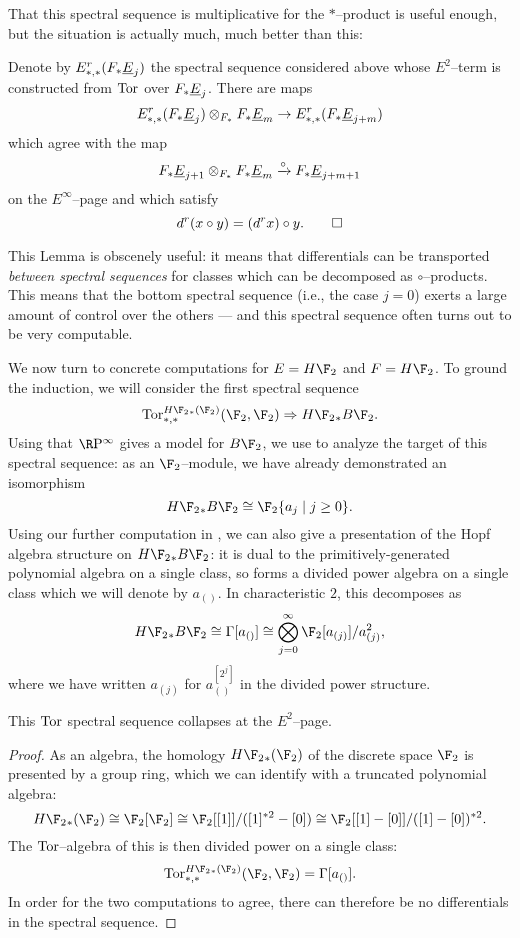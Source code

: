 That this spectral sequence is multiplicative for the $\ast$--product is useful enough, but the situation is actually much, much better than this:
\begin{lemma}\label{CircProductAndDifferentials}
Denote by $E^r_{*, *}(F_* \underline{\smash{E}}_{j})$ the spectral sequence considered above whose $E^2$--term is constructed from $\operatorname{Tor}$ over $F_* \underline{\smash{E}}_{j}$.  There are maps \[E^r_{*, *}(F_* \underline{\smash{E}}_{j}) \otimes_{F_*} F_* \underline{\smash{E}}_{m} \to E^r_{*, *}(F_* \underline{\smash{E}}_{j+m})\] which agree with the map \[F_* \underline{\smash{E}}_{j+1} \otimes_{F_*} F_* \underline{\smash{E}}_{m} \xrightarrow{\circ} F_* \underline{\smash{E}}_{j+m+1}\] on the $E^\infty$--page and which satisfy \[d^r(x \circ y) = (d^r x) \circ y. \qed\]
\end{lemma}
\noindent This Lemma is obscenely useful: it means that differentials can be transported \emph{between spectral sequences} for classes which can be decomposed as $\circ$--products.  This means that the bottom spectral sequence (i.e., the case $j = 0$) exerts a large amount of control over the others --- and this spectral sequence often turns out to be very computable.

We now turn to concrete computations for $E = H\F_2$ and $F = H\F_2$.  To ground the induction, we will consider the first spectral sequence \[\Tor^{H\F_2{}_*(\F_2)}_{*, *}(\F_2, \F_2) \Rightarrow H\F_2{}_* B\F_2.\]  Using that $\RP^\infty$ gives a model for $B\F_2$, we use  to analyze the target of this spectral sequence: as an $\F_2$--module, we have already demonstrated an isomorphism \[H\F_2{}_* B\F_2 \cong \F_2\{a_j \mid j \ge 0\}.\]  Using our further computation in , we can also give a presentation of the Hopf algebra structure on $H\F_2{}_* B\F_2$: it is dual to the primitively-generated polynomial algebra on a single class, so forms a divided power algebra on a single class which we will denote by $a_{()}$.  In characteristic $2$, this decomposes as \[H\F_2{}_* B\F_2 \cong \Gamma[a_{()}] \cong \bigotimes_{j=0}^\infty \F_2[a_{(j)}] / a_{(j)}^2,\] where we have written $a_{(j)}$ for $a_{()}^{[2^j]}$ in the divided power structure.

\begin{corollary}
This $\operatorname{Tor}$ spectral sequence collapses at the $E^2$--page.
\end{corollary}
\begin{proof}
As an algebra, the homology $H\F_2{}_*(\F_2)$ of the discrete space $\F_2$ is presented by a group ring, which we can identify with a truncated polynomial algebra: \[H\F_2{}_*(\F_2) \cong \F_2[\F_2] \cong \F_2[[1]] / ([1]^{\ast 2} - [0]) \cong \F_2[[1] - [0]] / ([1] - [0])^{\ast 2}.\]  The $\operatorname{Tor}$--algebra of this is then divided power on a single class: \[\Tor^{H\F_2{}_*(\F_2)}_{*, *}(\F_2, \F_2) = \Gamma[a_{()}].\]  In order for the two computations to agree, there can therefore be no differentials in the spectral sequence.
\end{proof}

